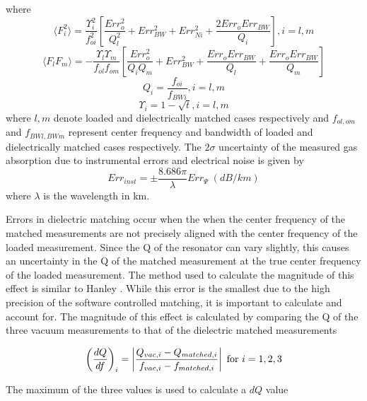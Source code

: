 \noindent where
\begin{equation}
\langle {F_i^2}\rangle = \frac{\Upsilon_i^2}{f_{oi}^2}
\left[ \frac{Err_o^2}{Q_l^2} + Err_{BW}^2 + Err_{Ni}^2 + \frac{2Err_o Err_{BW}}{Q_i} \right], i= l,m
\end{equation}
\begin{equation}
\langle {F_l F_m}\rangle = -\frac{\Upsilon_l \Upsilon_m}{f_{ol} f_{om}}
\left[ \frac{Err_o^2}{Q_i Q_m} + Err_{BW}^2 + \frac{Err_o Err_{BW}}{Q_l} + \frac{Err_o Err_{BW}}{Q_m}\right]
\end{equation}
\begin{equation}
Q_i = \frac{f_{oi}}{f_{BWi}}, i = l,m
\end{equation}
\begin{equation}
\Upsilon_i = 1- \sqrt{t}, i = l,m
\end{equation}
where $l,m$ denote loaded and dielectrically matched cases respectively and $f_{ol,om}$ and $f_{BWl,BWm}$ represent center frequency and bandwidth of loaded and dielectrically matched cases respectively. The $2\sigma$ uncertainty of the measured gas absorption due to instrumental errors and electrical noise is given by
\begin{equation}
Err_{inst} = \pm \frac{8.686\pi}{\lambda}Err_\Psi\;(dB/km)
\end{equation}
where $\lambda$ is the wavelength in km. 

Errors in dielectric matching occur when the when the center frequency of the matched measurements are not precisely aligned with the center frequency of the loaded measurement. Since the Q of the resonator can vary slightly, this causes an uncertainty in the Q of the matched measurement at the true center frequency of the loaded measurement. The method used to calculate the magnitude of this effect is similar to Hanley \cite{Hanley-thesis}. While this error is the smallest due to the high precision of the software controlled matching, it is important to calculate and account for. The magnitude of this effect is calculated by comparing the Q of the three vacuum measurements to that of the dielectric matched measurements

\begin{equation}
\left(\frac{dQ}{df} \right)_i = \left|\frac{Q_{vac,i} - Q_{matched,i}}{f_{vac,i} - f_{matched,i}} \right| \textnormal{ for } i = 1,2,3
\end{equation}

The maximum of the three values is used to calculate a $dQ$ value

